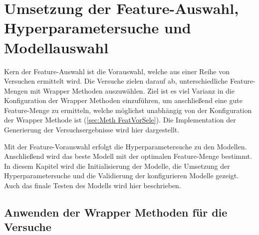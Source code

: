 \section{Umsetzung der Feature-Auswahl, Hyperparametersuche und Modellauswahl} \label{sec:umsetz FeatSelec}
Kern der Feature-Auswahl ist die Vorauswahl, welche aus einer Reihe von Versuchen ermittelt wird. Die Versuche zielen darauf ab, unterschiedliche Feature-Mengen mit Wrapper Methoden auszuwählen. Ziel ist es viel Varianz in die Konfiguration der Wrapper Methoden einzuführen, um anschließend eine gute Feature-Menge zu ermitteln, welche möglichst unabhängig von der Konfiguration der Wrapper Methode ist (\autoref{sec:Meth FeatVorSele}). Die Implementation der Generierung der Versuchsergebnisse wird hier dargestellt. \par

Mit der Feature-Vorauswahl erfolgt die Hyperparametersuche zu den Modellen. Anschließend wird das beste Modell mit der optimalen Feature-Menge bestimmt. In diesem Kapitel wird die Initialisierung der Modelle, die Umsetzung der Hyperparametersuche und die Validierung der konfigurieren Modelle gezeigt. Auch das finale Testen des Modells wird hier beschrieben. 

\subsection{Anwenden der Wrapper Methoden für die Versuche}

